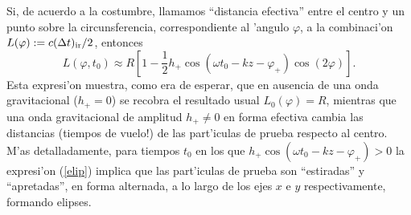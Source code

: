 Si, de acuerdo a la costumbre, llamamos ``distancia efectiva'' entre el centro y un punto sobre la circunsferencia, correspondiente al 'angulo $\varphi$, a la combinaci'on $L(\varphi):=c (\Delta t)_{\rm ir}/2$, entonces
\begin{equation}
\boxed{L(\varphi,t_0)\approx R\left[1-\frac{1}{2}h_+\cos(\omega t_0-kz-\varphi_+)\cos(2\varphi)\right].} \label{elip}
\end{equation}
Esta expresi'on muestra, como era de esperar, que en ausencia de una onda gravitacional ($h_+=0$) se recobra el resultado usual $L_0(\varphi)=R$, mientras que una onda gravitacional de amplitud $h_+\neq 0$ en forma efectiva cambia las distancias (tiempos de vuelo!) de las part'iculas de prueba respecto al centro. M'as detalladamente, para tiempos $t_0$ en los que $h_+\cos(\omega t_0-kz-\varphi_+)>0$ la expresi'on (\ref{elip}) implica que las part'iculas de prueba son ``estiradas'' y ``apretadas'', en forma alternada, a lo largo de los ejes $x$ e $y$ respectivamente, formando elipses.

